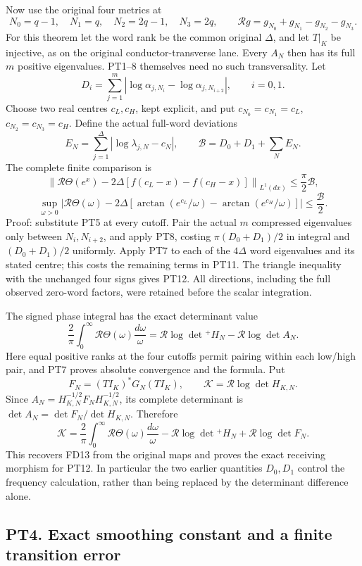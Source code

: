 \documentclass[10pt]{article}
\begin{document}
Now use the original four metrics at \[
 N_0=q-1,\quad N_1=q,\quad N_2=2q-1,\quad N_3=2q,
 \qquad\mathcal Rg=g_{N_0}+g_{N_1}-g_{N_2}-g_{N_3}.
 \tag{PT9}
\] For this theorem let the word rank be the common original \(\Delta\), and let \(T|_K\) be injective, as on the original conductor-transverse lane. Every \(A_N\) then has its full \(m\) positive eigenvalues. PT1--8 themselves need no such transversality. Let \[
 D_i=\sum_{j=1}^m|\log\alpha_{j,N_i}-\log\alpha_{j,N_{i+2}}|,
 \qquad i=0,1.
 \tag{PT10}
\] Choose two real centres \(c_L,c_H\), kept explicit, and put \(c_{N_0}=c_{N_1}=c_L\), \(c_{N_2}=c_{N_3}=c_H\). Define the actual full-word deviations \[
 E_N=\sum_{j=1}^{\Delta}|\log\lambda_{j,N}-c_N|,
 \qquad\mathcal B=D_0+D_1+\sum_NE_N.
 \tag{PT11}
\] The complete finite comparison is \[
 \left\|\mathcal R\Theta(e^x)-2\Delta[f(c_L-x)-f(c_H-x)]\right\|_{L^1(dx)}
 \le\frac\pi2\mathcal B,
\] \[
 \sup_{\omega>0}\left|\mathcal R\Theta(\omega)-2\Delta
  [\arctan(e^{c_L}/\omega)-\arctan(e^{c_H}/\omega)]\right|
 \le\frac{\mathcal B}2.
 \tag{PT12}
\] Proof: substitute PT5 at every cutoff. Pair the actual \(m\) compressed eigenvalues only between \(N_i,N_{i+2}\), and apply PT8, costing \(\pi(D_0+D_1)/2\) in integral and \((D_0+D_1)/2\) uniformly. Apply PT7 to each of the \(4\Delta\) word eigenvalues and its stated centre; this costs the remaining terms in PT11. The triangle inequality with the unchanged four signs gives PT12. All directions, including the full observed zero-word factors, were retained before the scalar integration.

The signed phase integral has the exact determinant value \[
 \frac2\pi\int_0^\infty\mathcal R\Theta(\omega)\frac{d\omega}{\omega}
 =\mathcal R\log\det{}^+H_N-\mathcal R\log\det A_N.
 \tag{PT13}
\] Here equal positive ranks at the four cutoffs permit pairing within each low/high pair, and PT7 proves absolute convergence and the formula. Put \[
 F_N=(TI_K)^*G_N(TI_K),\qquad
 \mathcal K=\mathcal R\log\det H_{K,N}.
\] Since \(A_N=H_{K,N}^{-1/2}F_NH_{K,N}^{-1/2}\), its complete determinant is \(\det A_N=\det F_N/\det H_{K,N}\). Therefore \[
 \boxed{\mathcal K=\frac2\pi\int_0^\infty\mathcal R\Theta(\omega)
 \frac{d\omega}{\omega}-\mathcal R\log\det{}^+H_N+
 \mathcal R\log\det F_N.}
 \tag{PT14}
\] This recovers FD13 from the original maps and proves the exact receiving morphism for PT12. In particular the two earlier quantities \(D_0,D_1\) control the frequency calculation, rather than being replaced by the determinant difference alone.

\subsection{PT4. Exact smoothing constant and a finite transition error}\label{pt4.-exact-smoothing-constant-and-a-finite-transition-error}
\end{document}
